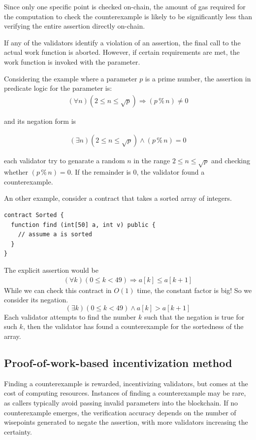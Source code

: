 \documentclass[runningheads]{llncs}
\begin{document}
Since only one specific point is checked on-chain, the amount of gas required for the computation to check the counterexample is likely to be significantly less than verifying the entire assertion directly on-chain.

If any of the validators identify a violation of an assertion, the final call to the actual work function is aborted. However, if certain requirements are met, the work function is invoked with the parameter.
 
Considering the example where a parameter $p$ is a prime number, the assertion in predicate logic for the parameter is:
\begin{gather}\label{eq:3a}
  (\forall n) (2 \le n \le \sqrt p) \Rightarrow (p \mathbin{\%} n) \ne 0
\end{gather}


\noindent and its negation form is 

\begin{gather}\label{eq:3b}
  (\exists n) (2 \le n \le \sqrt p) \wedge (p \mathbin{\%} n) = 0
\end{gather}

\noindent each validator try to genarate  a
random $n$ in the range $2 \le n \le 
\sqrt p$ and checking whether $(p \mathbin{\%} n) = 0$. If the remainder is $0$, the validator found a counterexample.

An other example, consider a contract that takes a sorted array of integers.
\begin{lstlisting}[numbers=none]
contract Sorted {
  function find (int[50] a, int v) public {
    // assume a is sorted
  }
}
\end{lstlisting}
The explicit assertion would be
\begin{gather}\label{eq:1}
  (\forall k) (0\le k <49) \Rightarrow a[k] \le a[k+1]
\end{gather}
While we can check this contract in $O(1)$ time, the constant factor is big! So we
consider its negation.
\begin{displaymath}
  (\exists k) (0\le k <49) \wedge a[k] > a[k+1]
\end{displaymath}
Each validator attempts to find the number $k$ such that the negation is true for such $k$, then the validator has found a counterexample for the sortedness of the array.
\subsection{Proof-of-work-based incentivization method}
Finding a counterexample is rewarded, incentivizing validators, but comes at the cost of computing resources. Instances of finding a counterexample may be rare, as callers typically avoid passing invalid parameters into the blockchain. If no counterexample emerges, the verification accuracy depends on the number of wisepoints generated to negate the assertion, with more validators increasing the certainty. 
\end{document}
